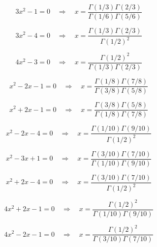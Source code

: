 \documentclass[11pt,a4paper]{article}
\begin{document}
\begin{equation}\label{eq:8}
3x^{2} - 1 = 0 \quad \Rightarrow \quad x = \frac{\Gamma(1/3)\Gamma(2/3)}{\Gamma(1/6)\Gamma(5/6)}
\end{equation}

\begin{equation}\label{eq:9}
3x^{2} - 4 = 0 \quad \Rightarrow \quad x = \frac{\Gamma(1/3)\Gamma(2/3)}{\Gamma(1/2)^2}
\end{equation}

\begin{equation}\label{eq:10}
4x^{2} - 3 = 0 \quad \Rightarrow \quad x = \frac{\Gamma(1/2)^2}{\Gamma(1/3)\Gamma(2/3)}
\end{equation}

\begin{equation}\label{eq:11}
x^{2} - 2x - 1 = 0 \quad \Rightarrow \quad x = \frac{\Gamma(1/8)\Gamma(7/8)}{\Gamma(3/8)\Gamma(5/8)}
\end{equation}

\begin{equation}\label{eq:12}
x^{2} + 2x - 1 = 0 \quad \Rightarrow \quad x = \frac{\Gamma(3/8)\Gamma(5/8)}{\Gamma(1/8)\Gamma(7/8)}
\end{equation}

\begin{equation}\label{eq:13}
x^{2} - 2x - 4 = 0 \quad \Rightarrow \quad x = \frac{\Gamma(1/10)\Gamma(9/10)}{\Gamma(1/2)^2}
\end{equation}

\begin{equation}\label{eq:14}
x^{2} - 3x + 1 = 0 \quad \Rightarrow \quad x = \frac{\Gamma(3/10)\Gamma(7/10)}{\Gamma(1/10)\Gamma(9/10)}
\end{equation}

\begin{equation}\label{eq:15}
x^{2} + 2x - 4 = 0 \quad \Rightarrow \quad x = \frac{\Gamma(3/10)\Gamma(7/10)}{\Gamma(1/2)^2}
\end{equation}

\begin{equation}\label{eq:16}
4x^{2} + 2x - 1 = 0 \quad \Rightarrow \quad x = \frac{\Gamma(1/2)^2}{\Gamma(1/10)\Gamma(9/10)}
\end{equation}

\begin{equation}\label{eq:17}
4x^{2} - 2x - 1 = 0 \quad \Rightarrow \quad x = \frac{\Gamma(1/2)^2}{\Gamma(3/10)\Gamma(7/10)}
\end{equation}
\end{document}
